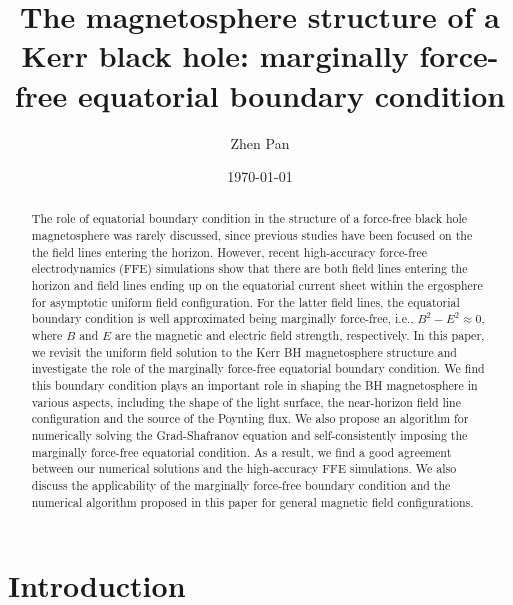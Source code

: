 \documentclass[aps,prd,reprint,nofootinbib, superscriptaddress]{revtex4-1}
\begin{document}
\title{The magnetosphere structure of a Kerr black hole:
marginally force-free equatorial boundary condition}
\author{Zhen Pan}

\date{\today}

\begin{abstract}
    The role of equatorial boundary condition in the structure of
    a force-free black hole magnetosphere was rarely discussed, since previous studies have been focused on the
    the field lines entering the horizon. However,
    recent high-accuracy force-free electrodynamics (FFE) simulations \cite{East2018}
    show that there are both field lines entering the horizon and field lines ending up on
    the equatorial current sheet within the ergosphere for asymptotic uniform field configuration.
    For the latter field lines, the equatorial boundary
    condition is well approximated being marginally force-free, i.e., $B^2-E^2\approx 0$, where $B$ and
    $E$ are the magnetic and electric field strength, respectively. In this paper, we revisit the uniform field
    solution to the Kerr BH magnetosphere structure and investigate the role of the marginally force-free
    equatorial boundary condition.  We find this boundary condition plays an important role in
    shaping the BH magnetosphere in various aspects, including the shape of the light surface, the near-horizon field
    line configuration and the source of the Poynting flux.
    We also propose an algorithm for numerically solving the Grad-Shafranov equation and self-consistently imposing the marginally force-free equatorial
    condition. As a result, we find a good agreement between our numerical solutions and the high-accuracy FFE simulations.
    We also discuss the applicability of the marginally force-free boundary condition and the numerical algorithm
    proposed in this paper for general magnetic field configurations.
\end{abstract}


\maketitle

\section{Introduction}
\end{document}
